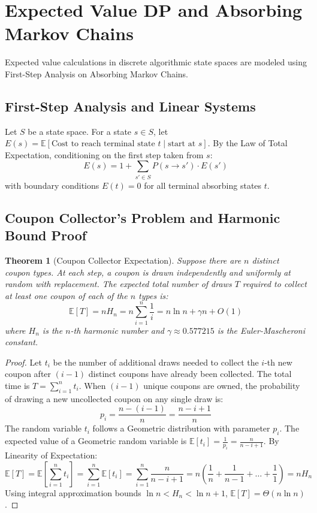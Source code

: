 \documentclass[10pt,journal,compsoc,onecolumn]{IEEEtran}
\newtheorem{theorem}{Theorem}
\begin{document}
\section{Expected Value DP and Absorbing Markov Chains}
\label{sec:expected-value-dp}

Expected value calculations in discrete algorithmic state spaces are modeled using First-Step Analysis on Absorbing Markov Chains.

\subsection{First-Step Analysis and Linear Systems}

Let $S$ be a state space. For a state $s \in S$, let $E(s) = \mathbb{E}[\text{Cost to reach terminal state } t \mid \text{start at } s]$.
By the Law of Total Expectation, conditioning on the first step taken from $s$:
\begin{equation}
E(s) = 1 + \sum_{s' \in S} P(s \rightarrow s') \cdot E(s')
\label{eq:first-step-analysis}
\end{equation}
with boundary conditions $E(t) = 0$ for all terminal absorbing states $t$.

\subsection{Coupon Collector's Problem and Harmonic Bound Proof}

\begin{theorem}[Coupon Collector Expectation]
Suppose there are $n$ distinct coupon types. At each step, a coupon is drawn independently and uniformly at random with replacement. The expected total number of draws $T$ required to collect at least one coupon of each of the $n$ types is:
\begin{equation}
\mathbb{E}[T] = n H_n = n \sum_{i=1}^{n} \frac{1}{i} = n \ln n + \gamma n + O(1)
\label{eq:coupon-collector}
\end{equation}
where $H_n$ is the $n$-th harmonic number and $\gamma \approx 0.577215$ is the Euler-Mascheroni constant.
\end{theorem}

\begin{proof}
Let $t_i$ be the number of additional draws needed to collect the $i$-th new coupon after $(i-1)$ distinct coupons have already been collected. The total time is $T = \sum_{i=1}^n t_i$.
When $(i-1)$ unique coupons are owned, the probability of drawing a new uncollected coupon on any single draw is:
\[
p_i = \frac{n - (i-1)}{n} = \frac{n - i + 1}{n}
\]
The random variable $t_i$ follows a Geometric distribution with parameter $p_i$. The expected value of a Geometric random variable is $\mathbb{E}[t_i] = \frac{1}{p_i} = \frac{n}{n - i + 1}$.
By Linearity of Expectation:
\[
\mathbb{E}[T] = \mathbb{E}\left[ \sum_{i=1}^{n} t_i \right] = \sum_{i=1}^{n} \mathbb{E}[t_i] = \sum_{i=1}^{n} \frac{n}{n - i + 1} = n \left( \frac{1}{n} + \frac{1}{n-1} + \dots + \frac{1}{1} \right) = n H_n
\]
Using integral approximation bounds $\ln n < H_n < \ln n + 1$, $\mathbb{E}[T] = \Theta(n \ln n)$.
\end{proof}
\end{document}
